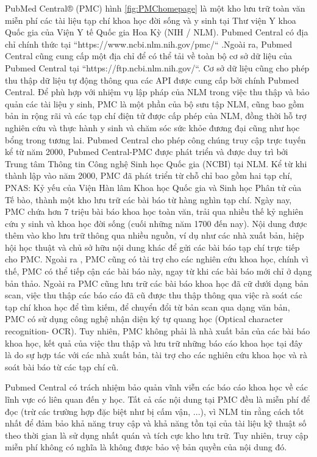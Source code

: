 \documentclass[../DoAn.tex]{subfiles}
\begin{document}
PubMed Central® (PMC) hình \ref{fig:PMChomepage} là một kho lưu trữ toàn văn miễn phí các tài liệu tạp chí khoa học đời sống và y sinh tại Thư viện Y khoa Quốc gia của Viện Y tế Quốc gia Hoa Kỳ (NIH / NLM). Pubmed Central có địa chỉ chính thức tại ``https://www.ncbi.nlm.nih.gov/pmc/`` .Ngoài ra, Pubmed Central cũng cung cấp một địa chỉ để có thể tải về toàn bộ cơ sở dữ liệu của Pubmed Central tại ``https://ftp.ncbi.nlm.nih.gov/``. Cơ sở dữ liệu cũng cho phép thu thập dữ liệu tự động thông qua các API được cung cấp bởi chính Pubmed Central. Để phù hợp với nhiệm vụ lập pháp của NLM trong việc thu thập và bảo quản các tài liệu y sinh, PMC là một phần của bộ sưu tập NLM, cũng bao gồm bản in rộng rãi và các tạp chí điện tử được cấp phép của NLM, đồng thời hỗ trợ nghiên cứu và thực hành y sinh và chăm sóc sức khỏe đương đại cũng như học bổng trong tương lai. Pubmed Central cho phép công chúng truy cập trực tuyến kể từ năm 2000, Pubmed Central-PMC được phát triển và được duy trì bởi Trung tâm Thông tin Công nghệ Sinh học Quốc gia (NCBI) tại NLM. Kể từ khi thành lập vào năm 2000, PMC đã phát triển từ chỗ chỉ bao gồm hai tạp chí, PNAS: Kỷ yếu của Viện Hàn lâm Khoa học Quốc gia và Sinh học Phân tử của Tế bào, thành một kho lưu trữ các bài báo từ hàng nghìn tạp chí. Ngày nay, PMC chứa hơn 7 triệu bài báo khoa học toàn văn, trải qua nhiều thế kỷ nghiên cứu y sinh và khoa học đời sống (cuối những năm 1700 đến nay). Nội dung được thêm vào kho lưu trữ thông qua nhiều nguồn, ví dụ như các nhà xuất bản, hiệp hội học thuật và chủ sở hữu nội dung khác để gửi các bài báo tạp chí trực tiếp cho PMC. Ngoài ra , PMC cũng có tài trợ cho các nghiên cứu khoa học, chính vì thế, PMC có thể tiếp cận các bài báo này, ngay từ khi các bài báo mới chỉ ở dạng bản thảo. Ngoài ra PMC cũng lưu trữ các bài báo khoa học đã cữ dưới dạng bản scan, việc thu thập các báo cáo đã cũ được thu thập thông qua việc rà soát các tạp chí khoa học để tìm kiếm, để chuyển đổi từ bản scan qua dạng văn bản, PMC có sử dụng công nghệ nhận diện ký tự quang học (Optical character recognition- OCR). Tuy nhiên, PMC không phải là nhà xuất bản của các bài báo khoa học, kết quả của việc thu thập và lưu trữ những báo cáo khoa học tại đây là do sự hợp tác với các nhà xuất bản, tài trợ cho các nghiên cứu khoa học và rà soát bài báo từ các tạp chí cũ.

Pubmed Central có trách nhiệm bảo quản vĩnh viễn các báo cáo khoa học về các lĩnh vực có liên quan đến y học. Tất cả các nội dung tại PMC đều là miễn phí để đọc (trừ các trường hợp đặc biệt như bị cấm vận, ...), vì NLM tin rằng cách tốt nhất để đảm bảo khả năng truy cập và khả năng tồn tại của tài liệu kỹ thuật số theo thời gian là sử dụng nhất quán và tích cực kho lưu trữ. Tuy nhiên, truy cập miễn phí không có nghĩa là không được bảo vệ bản quyền của nội dung đó. 
\end{document}

